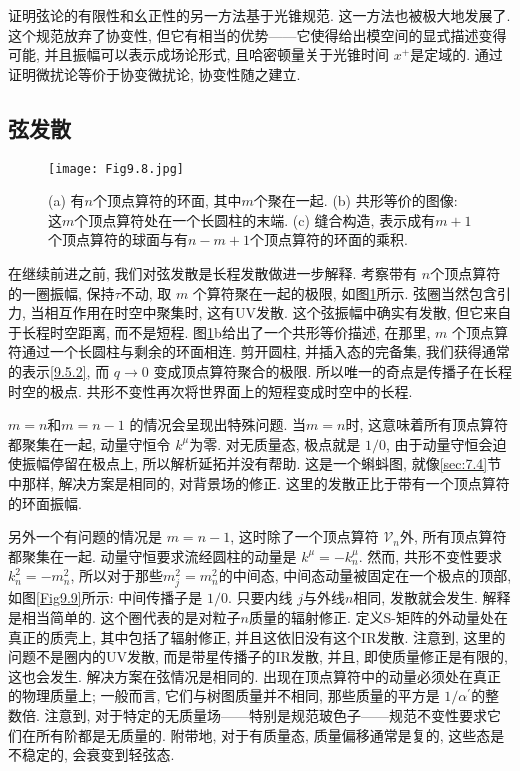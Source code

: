 证明弦论的有限性和幺正性的另一方法基于光锥规范. 这一方法也被极大地发展了. 这个规范放弃了协变性, 但它有相当的优势——它使得给出模空间的显式描述变得可能, 
并且振幅可以表示成场论形式, 且哈密顿量关于光锥时间 $x^{+}$是定域的. 通过证明微扰论等价于协变微扰论, 协变性随之建立.

\subsection*{弦发散}


\begin{figure}
	\begin{center}
		\texttt{[image: Fig9.8.jpg]}\\
		\caption{(a) 有$n$个顶点算符的环面, 其中$m$个聚在一起. (b) 共形等价的图像: 这$m$个顶点算符处在一个长圆柱的末端. 
		(c) 缝合构造, 表示成有$m{+}1$个顶点算符的球面与有$n{-}m{+}1$个顶点算符的环面的乘积.}\label{Fig9.8}
	\end{center}
\end{figure}

在继续前进之前, 我们对弦发散是长程发散做进一步解释. 考察带有 $n$个顶点算符的一圈振幅, 保持$\tau$不动, 取 $m$ 个算符聚在一起的极限, 如图\ref{Fig9.8}所示. 
弦圈当然包含引力, 当相互作用在时空中聚集时, 这有UV发散. 这个弦振幅中确实有发散, 但它来自于长程时空距离, 而不是短程. 
图\ref{Fig9.8}b给出了一个共形等价描述, 在那里, $m$ 个顶点算符通过一个长圆柱与剩余的环面相连. 剪开圆柱, 并插入态的完备集, 
我们获得通常的表示\eqref{9.5.2}, 而 $q \rightarrow 0$ 变成顶点算符聚合的极限. 所以唯一的奇点是传播子在长程时空的极点. 
共形不变性再次将世界面上的短程变成时空中的长程.

$m=n$和$m=n{-}1$ 的情况会呈现出特殊问题. 当$m=n$时, 这意味着所有顶点算符都聚集在一起, 动量守恒令 $k^{\mu}$为零. 对无质量态, 极点就是 $1/0$, 
由于动量守恒会迫使振幅停留在极点上, 所以解析延拓并没有帮助. 这是一个蝌蚪图, 就像\ref{sec:7.4}节中那样, 解决方案是相同的, 对背景场的修正. 
这里的发散正比于带有一个顶点算符的环面振幅.

另外一个有问题的情况是 $m=n-1$, 这时除了一个顶点算符 $\mathscr{V}_{n}$外, 所有顶点算符都聚集在一起. 
动量守恒要求流经圆柱的动量是 $k^{\mu}=-k_{n}^{\mu}$. 然而, 共形不变性要求$k_{n}^{2}=-m_{n}^{2}$, 所以对于那些$m_{j}^{2}=m_{n}^{2}$的中间态, 
中间态动量被固定在一个极点的顶部, 如图\ref{Fig9.9}所示: 中间传播子是 $1/0$. 只要内线 $j$与外线$n$相同, 发散就会发生. 
解释是相当简单的. 这个圈代表的是对粒子$n$质量的辐射修正. 定义S-矩阵的外动量处在真正的质壳上, 其中包括了辐射修正, 并且这依旧没有这个IR发散. 
注意到, 这里的问题不是圈内的UV发散, 而是带星传播子的IR发散, 并且, 即使质量修正是有限的, 这也会发生. 
解决方案在弦情况是相同的. 出现在顶点算符中的动量必须处在真正的物理质量上; 一般而言, 它们与树图质量并不相同, 
那些质量的平方是 $1 / \alpha^{\prime}$的整数倍. 注意到, 对于特定的无质量场——特别是规范玻色子——规范不变性要求它们在所有阶都是无质量的. 
附带地, 对于有质量态, 质量偏移通常是复的, 这些态是不稳定的, 会衰变到轻弦态.

